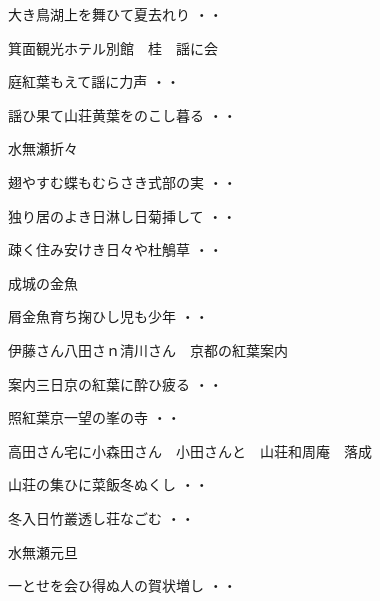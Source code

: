 \begin{shiika}大き鳥湖上を舞ひて夏去れり
\hfill{・・}\end{shiika}
\vspace{0.6cm}
箕面観光ホテル別館　桂　謡に会
\begin{shiika}庭紅葉もえて謡に力声
\hfill{・・}\end{shiika}
\begin{shiika}謡ひ果て山荘黄葉をのこし暮る
\hfill{・・}\end{shiika}
\vspace{0.6cm}
水無瀬折々
\begin{shiika}翅やすむ蝶もむらさき式部の実
\hfill{・・}\end{shiika}
\begin{shiika}独り居のよき日淋し日菊挿して
\hfill{・・}\end{shiika}
\begin{shiika}疎く住み安けき日々や杜鵤草
\hfill{・・}\end{shiika}
\vspace{0.6cm}
成城の金魚
\begin{shiika}屑金魚育ち掬ひし児も少年
\hfill{・・}\end{shiika}
\vspace{0.6cm}
伊藤さん八田さｎ清川さん　京都の紅葉案内
\begin{shiika}案内三日京の紅葉に酔ひ疲る
\hfill{・・}\end{shiika}
\vspace{0.6cm}
\begin{shiika}照紅葉京一望の峯の寺
\hfill{・・}\end{shiika}
\vspace{0.6cm}
高田さん宅に小森田さん　小田さんと　山荘和周庵　落成
\begin{shiika}山荘の集ひに菜飯冬ぬくし
\hfill{・・}\end{shiika}
\begin{shiika}冬入日竹叢透し荘なごむ
\hfill{・・}\end{shiika}
\vspace{0.6cm}
水無瀬元旦
\begin{shiika}一とせを会ひ得ぬ人の賀状増し
\hfill{・・}\end{shiika}
